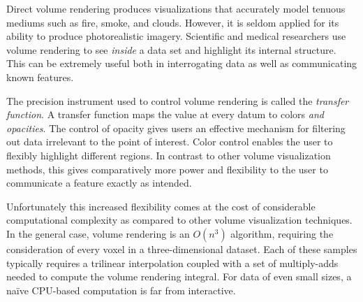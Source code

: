 
Direct volume rendering produces visualizations that accurately model
tenuous mediums such as fire, smoke, and clouds.  However, it is
seldom applied for its ability to produce photorealistic imagery.  
Scientific and medical researchers use volume rendering to see
\emph{inside} a data set and highlight its internal structure.
This can be extremely useful both in interrogating data as well as
communicating known features.



The precision instrument used to control volume rendering is called the
\emph{transfer function}.  A transfer function maps the value at every
datum to colors \emph{and opacities}.  The control of opacity gives
users an effective mechanism for filtering out data irrelevant to
the point of interest.  Color control enables the user to flexibly
highlight different regions.  In contrast to other volume visualization
methods, this gives comparatively more power and flexibility to the
user to communicate a feature exactly as intended.

Unfortunately this increased flexibility comes at the cost of
considerable computational complexity as compared to other volume
visualization techniques.  In the general case, volume rendering is an
$O(n^3)$ algorithm, requiring the consideration of every voxel in a
three-dimensional dataset.  Each of these samples typically requires a
trilinear interpolation coupled with a set of multiply-adds needed to
compute the volume rendering integral.  For data of even small sizes, a
na\"ive CPU-based computation is far from interactive.



